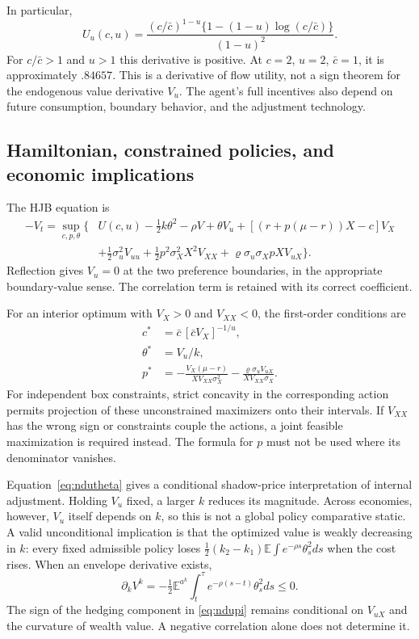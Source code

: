 \documentclass[ecta,draft]{econsocart}
\theoremstyle{definition}
\theoremstyle{remark}
\newcommand{\E}{\mathbb E}
\begin{document}
In particular,
\begin{equation}\label{eq:uderivative}
 U_u(c,u)=\frac{(c/\bar c)^{1-u}\{1-(1-u)\log(c/\bar c)\}}{(1-u)^2}.
\end{equation}
For $c/\bar c>1$ and $u>1$ this derivative is positive. At $c=2$, $u=2$, $\bar c=1$, it is approximately $.84657$. This is a derivative of flow utility, not a sign theorem for the endogenous value derivative $V_u$. The agent's full incentives also depend on future consumption, boundary behavior, and the adjustment technology.

\subsection{Hamiltonian, constrained policies, and economic implications}
The HJB equation is
\begin{align}\label{eq:nduhjb}
 -V_t=\sup_{c,p,\theta}\big\{&U(c,u)-\tfrac12 k\theta^2-\rho V
 +\theta V_u+[(r+p(\mu-r))X-c]V_X\nonumber\\
 &+\tfrac12\sigma_u^2V_{uu}+\tfrac12p^2\sigma_X^2X^2V_{XX}
 +\varrho\sigma_u\sigma_X pX V_{uX}\big\}.
\end{align}
Reflection gives $V_u=0$ at the two preference boundaries, in the appropriate boundary-value sense. The correlation term is retained with its correct coefficient.

For an interior optimum with $V_X>0$ and $V_{XX}<0$, the first-order conditions are
\begin{align}
 c^*&=\bar c\,[\bar c V_X]^{-1/u},\label{eq:nduc}\\
 \theta^*&=V_u/k,\label{eq:ndutheta}\\
 p^*&=-\frac{V_X(\mu-r)}{XV_{XX}\sigma_X^2}
       -\frac{\varrho\sigma_u V_{uX}}{XV_{XX}\sigma_X}.\label{eq:ndupi}
\end{align}
For independent box constraints, strict concavity in the corresponding action permits projection of these unconstrained maximizers onto their intervals. If $V_{XX}$ has the wrong sign or constraints couple the actions, a joint feasible maximization is required instead. The formula for $p$ must not be used where its denominator vanishes.

Equation~\eqref{eq:ndutheta} gives a conditional shadow-price interpretation of internal adjustment. Holding $V_u$ fixed, a larger $k$ reduces its magnitude. Across economies, however, $V_u$ itself depends on $k$, so this is not a global policy comparative static. A valid unconditional implication is that the optimized value is weakly decreasing in $k$: every fixed admissible policy loses $\tfrac12(k_2-k_1)\E\int e^{-\rho s}\theta_s^2ds$ when the cost rises. When an envelope derivative exists,
\begin{equation}\label{eq:envelope}
 \partial_k V^k=-\tfrac12\E^{a^k}\int_t^\tau e^{-\rho(s-t)}\theta_s^2ds\leq0.
\end{equation}
The sign of the hedging component in \eqref{eq:ndupi} remains conditional on $V_{uX}$ and the curvature of wealth value. A negative correlation alone does not determine it.
\end{document}
